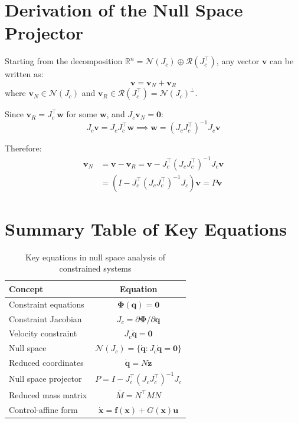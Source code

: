 \documentclass[11pt,a4paper]{article}
\theoremstyle{definition}
\newcommand{\R}{\mathbb{R}}
\newcommand{\nullspace}{\mathcal{N}}
\newcommand{\rangespace}{\mathcal{R}}
\newcommand{\Jc}{J_c}
\newcommand{\qvec}{\bm{q}}
\newcommand{\xvec}{\bm{x}}
\newcommand{\uvec}{\bm{u}}
\newcommand{\fvec}{\bm{f}}
\newcommand{\Phivec}{\bm{\Phi}}
\begin{document}
\section{Derivation of the Null Space Projector}

Starting from the decomposition $\R^n = \nullspace(\Jc) \oplus \rangespace(\Jc^\top)$, any vector $\bm{v}$ can be written as:
\begin{equation}
    \bm{v} = \bm{v}_N + \bm{v}_R
\end{equation}
where $\bm{v}_N \in \nullspace(\Jc)$ and $\bm{v}_R \in \rangespace(\Jc^\top) = \nullspace(\Jc)^\perp$.

Since $\bm{v}_R = \Jc^\top \bm{w}$ for some $\bm{w}$, and $\Jc \bm{v}_N = \bm{0}$:
\begin{equation}
    \Jc \bm{v} = \Jc \Jc^\top \bm{w} \implies \bm{w} = (\Jc \Jc^\top)^{-1} \Jc \bm{v}
\end{equation}

Therefore:
\begin{align}
    \bm{v}_N &= \bm{v} - \bm{v}_R = \bm{v} - \Jc^\top (\Jc \Jc^\top)^{-1} \Jc \bm{v} \\
    &= \left(I - \Jc^\top (\Jc \Jc^\top)^{-1} \Jc\right) \bm{v} = P \bm{v}
\end{align}

\section{Summary Table of Key Equations}

\begin{table}[htbp]
\centering
\caption{Key equations in null space analysis of constrained systems}
\begin{tabular}{@{}lc@{}}
\toprule
\textbf{Concept} & \textbf{Equation} \\
\midrule
Constraint equations & $\Phivec(\qvec) = \bm{0}$ \\
Constraint Jacobian & $\Jc = \partial \Phivec / \partial \qvec$ \\
Velocity constraint & $\Jc \dot{\qvec} = \bm{0}$ \\
Null space & $\nullspace(\Jc) = \{\dot{\qvec} : \Jc \dot{\qvec} = \bm{0}\}$ \\
Reduced coordinates & $\dot{\qvec} = N \dot{\bm{z}}$ \\
Null space projector & $P = I - \Jc^\top(\Jc \Jc^\top)^{-1}\Jc$ \\
Reduced mass matrix & $\bar{M} = N^\top M N$ \\
Control-affine form & $\dot{\xvec} = \fvec(\xvec) + G(\xvec)\uvec$ \\
\bottomrule
\end{tabular}
\end{table}
\end{document}
